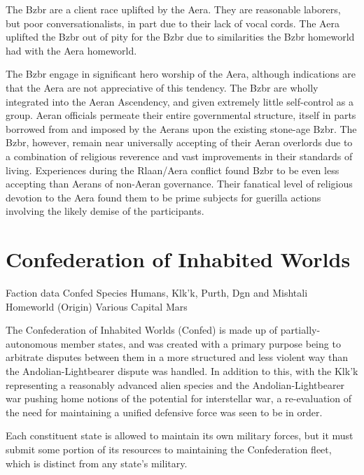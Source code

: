 The Bzbr are a client race uplifted by the Aera. They are reasonable
laborers, but poor conversationalists, in part due to their lack of
vocal cords.  The Aera uplifted the Bzbr out of pity for the Bzbr due
to similarities the Bzbr homeworld had with the Aera homeworld.

The Bzbr engage in significant hero worship of the Aera, although
indications are that the Aera are not appreciative of this
tendency. The Bzbr are wholly integrated into the Aeran Ascendency,
and given extremely little self-control as a group. Aeran officials
permeate their entire governmental structure, itself in parts borrowed
from and imposed by the Aerans upon the existing stone-age Bzbr. The
Bzbr, however, remain near universally accepting of their Aeran
overlords due to a combination of religious reverence and vast
improvements in their standards of living. Experiences during the
Rlaan/Aera conflict found Bzbr to be even less accepting than Aerans
of non-Aeran governance. Their fanatical level of religious devotion
to the Aera found them to be prime subjects for guerilla actions
involving the likely demise of the participants.


\section{Confederation of Inhabited Worlds}

Faction data 
Confed 
Species 	Humans, Klk'k, Purth, Dgn and Mishtali 
Homeworld (Origin) 	Various 
Capital 	Mars 

The Confederation of Inhabited Worlds (Confed) is made up of
partially-autonomous member states, and was created with a primary
purpose being to arbitrate disputes between them in a more structured
and less violent way than the Andolian-Lightbearer dispute was
handled. In addition to this, with the Klk'k representing a reasonably
advanced alien species and the Andolian-Lightbearer war pushing home
notions of the potential for interstellar war, a re-evaluation of the
need for maintaining a unified defensive force was seen to be in
order.

Each constituent state is allowed to maintain its own military forces,
but it must submit some portion of its resources to maintaining the
Confederation fleet, which is distinct from any state's military.

